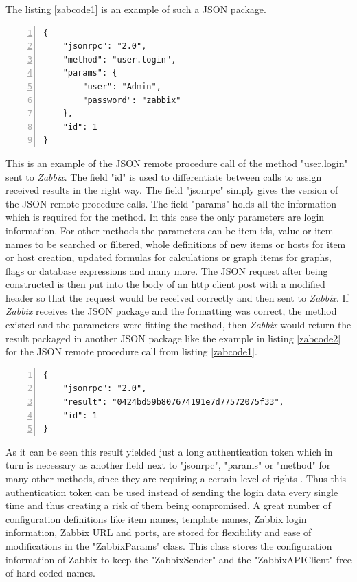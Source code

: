 The listing \ref{zabcode1} is an example of such a JSON package.
\begin{lstlisting}[language=json_sw,caption={JSON authentication request \cite{zab3}},captionpos=b,numbers=left,label=zabcode1]
{
    "jsonrpc": "2.0",
    "method": "user.login",
    "params": {
        "user": "Admin",
        "password": "zabbix"
    },
    "id": 1
}\end{lstlisting} 
	This is an example of the JSON remote procedure call of the method "user.login" sent to \textit{Zabbix}. The field "id" is used to differentiate between calls to assign received results in the right way. The field "jsonrpc" simply gives the version of the JSON remote procedure calls. The field "params" holds all the information which is required for the method. In this case the only parameters are login information. For other methods the parameters can be item ids, value or item names to be searched or filtered, whole definitions of new items or hosts for item or host creation, updated formulas for calculations or graph items for graphs, flags or database expressions and many more. The JSON request after being constructed is then put into the body of an http client post with a modified header so that the request would be received correctly and then sent to \textit{Zabbix}. If \textit{Zabbix} receives the JSON package and the formatting was correct, the method existed and the parameters were fitting the method, then \textit{Zabbix} would return the result packaged in another JSON package like the example in listing \ref{zabcode2} for the JSON remote procedure call from listing \ref{zabcode1}.
	\begin{lstlisting}[language=json_sw,caption={JSON authentication response \cite{zab3}},captionpos=b,numbers=left,label=zabcode2]
{
    "jsonrpc": "2.0",
    "result": "0424bd59b807674191e7d77572075f33",
    "id": 1
}
\end{lstlisting}
	As it can be seen this result yielded just a long authentication token which in turn is necessary as another field next to "jsonrpc", "params" or "method" for many other methods, since they are requiring a certain level of rights \cite{zab3}. Thus this authentication token can be used instead of sending the login data every single time and thus creating a risk of them being compromised.
	A great number of configuration definitions like item names, template names, Zabbix login information, Zabbix URL and ports, are stored for flexibility and ease of modifications in the "ZabbixParams" class. This class stores the configuration information of Zabbix to keep the "ZabbixSender" and the "ZabbixAPIClient" free of hard-coded names.
